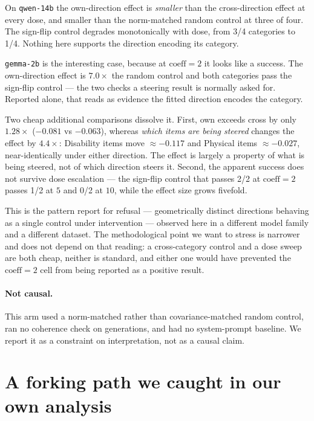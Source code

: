 \documentclass{article}
\begin{document}
On \texttt{qwen-14b} the own-direction effect is \emph{smaller} than the
cross-direction effect at every dose, and smaller than the norm-matched random
control at three of four. The sign-flip control degrades monotonically with dose,
from 3/4 categories to 1/4. Nothing here supports the direction encoding its
category.

\texttt{gemma-2b} is the interesting case, because at $\mathrm{coeff}{=}2$ it
looks like a success. The own-direction effect is $7.0\times$ the random control
and both categories pass the sign-flip control --- the two checks a steering
result is normally asked for. Reported alone, that reads as evidence the fitted
direction encodes the category.

Two cheap additional comparisons dissolve it. First, own exceeds cross by only
$1.28\times$ ($-0.081$ vs $-0.063$), whereas \emph{which items are being steered}
changes the effect by $4.4\times$: Disability items move $\approx -0.117$ and
Physical items $\approx -0.027$, near-identically under either direction. The
effect is largely a property of what is being steered, not of which direction
steers it. Second, the apparent success does not survive dose escalation --- the
sign-flip control that passes 2/2 at $\mathrm{coeff}{=}2$ passes 1/2 at $5$ and
0/2 at $10$, while the effect size grows fivefold.

This is the pattern \citet{joad2026} report for refusal --- geometrically
distinct directions behaving as a single control under intervention --- observed
here in a different model family and a different dataset. The methodological
point we want to stress is narrower and does not depend on that reading: a
cross-category control and a dose sweep are both cheap, neither is standard, and
either one would have prevented the $\mathrm{coeff}{=}2$ cell from being
reported as a positive result.

\paragraph{Not causal.} This arm used a norm-matched rather than
covariance-matched random control, ran no coherence check on generations, and
had no system-prompt baseline. We report it as a constraint on interpretation,
not as a causal claim.

\section{A forking path we caught in our own analysis}
\label{sec:structure}
\end{document}
